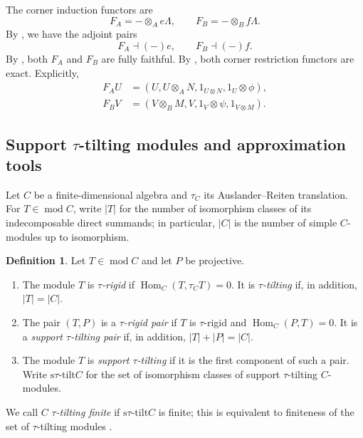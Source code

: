 \documentclass[11pt,reqno]{amsart}
\theoremstyle{definition}
\newtheorem{definition}[theorem]{Definition}
\theoremstyle{remark}
\newcommand{\modu}{\operatorname{mod}}
\newcommand{\Hom}{\operatorname{Hom}}
\newcommand{\stau}{\mathrm{s}\tau\text{-}\mathrm{tilt}}
\numberwithin{equation}{section}
\begin{document}
The corner induction functors are
\[
 F_A=-\otimes_Ae\Lambda,
 \qquad
 F_B=-\otimes_Bf\Lambda.
\]
By \cite[Proposition~2.4(ii)]{GreenPsaroudakis}, we have the adjoint pairs
\[
 F_A\dashv(-)e,
 \qquad
 F_B\dashv(-)f.
\]
By \cite[Proposition~2.4(i)]{GreenPsaroudakis}, both $F_A$ and $F_B$ are
fully faithful.  By \cite[Proposition~2.4(iii)]{GreenPsaroudakis}, both
corner restriction functors are exact.  Explicitly,
\begin{align*}
 F_AU&=(U,U\otimes_AN,1_{U\otimes N},1_U\otimes\phi),\\
 F_BV&=(V\otimes_BM,V,1_V\otimes\psi,1_{V\otimes M}).
\end{align*}

\subsection{Support \texorpdfstring{$\tau$}{tau}-tilting modules and
approximation tools}

Let $C$ be a finite-dimensional algebra and $\tau_C$ its
Auslander--Reiten translation.  For $T\in\modu C$, write $|T|$ for the
number of isomorphism classes of its indecomposable direct summands; in
particular, $|C|$ is the number of simple $C$-modules up to isomorphism.

\begin{definition}\label{def:tau-tilting}
Let $T\in\modu C$ and let $P$ be projective.
\begin{enumerate}[label=\textup{(\arabic*)},leftmargin=2.2em,nosep]
 \item The module $T$ is \emph{$\tau$-rigid} if
 $\Hom_C(T,\tau_CT)=0$.  It is \emph{$\tau$-tilting} if, in addition,
 $|T|=|C|$.
 \item The pair $(T,P)$ is a \emph{$\tau$-rigid pair} if $T$ is
 $\tau$-rigid and $\Hom_C(P,T)=0$.  It is a \emph{support
 $\tau$-tilting pair} if, in addition, $|T|+|P|=|C|$.
 \item The module $T$ is \emph{support $\tau$-tilting} if it is the first
 component of such a pair.  Write $\stau C$ for the set of isomorphism
 classes of support $\tau$-tilting $C$-modules.
\end{enumerate}
\end{definition}

We call $C$ \emph{$\tau$-tilting finite} if $\stau C$ is finite; this is
equivalent to finiteness of the set of $\tau$-tilting modules
\cite[Proposition~3.9]{DIJ}.
\end{document}
